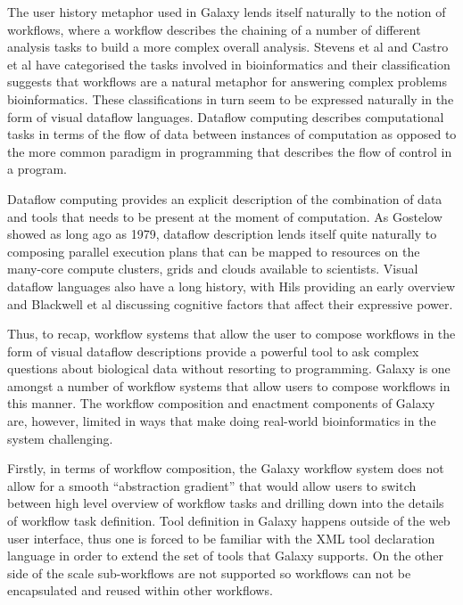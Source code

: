 \documentclass[a4paper,10pt]{scrreprt} \usepackage[utf8]{inputenc}
\begin{document}
The user history metaphor used in Galaxy lends itself naturally to the notion of workflows, where a workflow describes the chaining of a number of different analysis tasks to build a more complex overall analysis. Stevens et al \cite{stevens_classification_2001} and Castro et al \cite{castro_workflows_2005} have categorised the tasks involved in bioinformatics and their classification suggests that workflows are a natural metaphor for answering complex problems bioinformatics. These classifications in turn seem to be expressed naturally in the form of visual dataflow languages. Dataflow computing describes computational tasks in terms of the flow of data between instances of computation \cite{gostelow_view_1979} as opposed to the more common paradigm in programming that describes the flow of control in a program.

Dataflow computing provides an explicit description of the combination of data and tools that needs to be present at the moment of computation. As Gostelow \cite{gostelow_view_1979} showed as long ago as 1979, dataflow description lends itself quite naturally to composing parallel execution plans that can be mapped to resources on the many-core compute clusters, grids and clouds available to scientists. Visual dataflow languages also have a long history, with Hils \cite{hils_visual_1992} providing an early overview and Blackwell et al \cite{blackwell_cognitive_2001} discussing cognitive factors that affect their expressive power.

Thus, to recap, workflow systems that allow the user to compose workflows in the form of visual dataflow descriptions provide a powerful tool to ask complex questions about biological data without resorting to programming. Galaxy is one amongst a number of workflow systems that allow users to compose workflows in this manner. The workflow composition and enactment components of Galaxy are, however, limited in ways that make doing real-world bioinformatics in the system challenging.

Firstly, in terms of workflow composition, the Galaxy workflow system does not allow for a smooth ``abstraction gradient'' that would allow users to switch between high level overview of workflow tasks and drilling down into the details of workflow task definition. Tool definition in Galaxy happens outside of the web user interface, thus one is forced to be familiar with the XML tool declaration language in order to extend the set of tools that Galaxy supports. On the other side of the scale sub-workflows are not supported so workflows can not be encapsulated and reused within other workflows.
\end{document}
